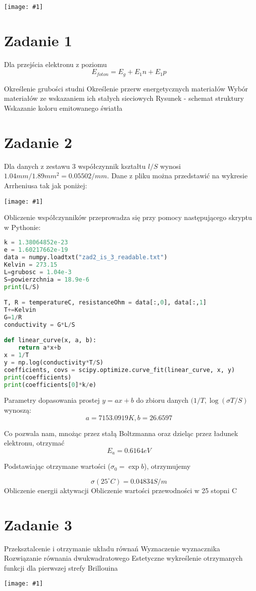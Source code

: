\documentclass[11pt]{article}
\newcommand{\largepng}[1]{\begin{center}\texttt{[image: \#1]}\end{center}}
\begin{document}
\largepng{tabelka.png}
\section{Zadanie 1}

Dla przejścia elektronu z poziomu
\[E_{foton} = E_g + E_1n + E_1p\]

Określenie grubości studni
Określenie przerw energetycznych materiałów
Wybór materiałów ze wskazaniem ich stałych sieciowych
Rysunek - schemat struktury
Wskazanie koloru emitowanego światła
\section{Zadanie 2}

Dla danych z zestawu 3 współczynnik kształtu $l/S$ wynosi $1.04mm/1.89mm^2 = 0.05502/mm$.
Dane z pliku można przedstawić na wykresie Arrheniusa tak jak poniżej:
\largepng{z2.png}

Obliczenie współczynników przeprowadza się przy pomocy następującego skryptu w Pythonie:
\begin{lstlisting}[language=Python]
k = 1.38064852e-23
e = 1.60217662e-19
data = numpy.loadtxt("zad2_is_3_readable.txt")
Kelvin = 273.15
L=grubosc = 1.04e-3
S=powierzchnia = 18.9e-6
print(L/S)

T, R = temperatureC, resistanceOhm = data[:,0], data[:,1]
T+=Kelvin
G=1/R
conductivity = G*L/S

def linear_curve(x, a, b):
    return a*x+b
x = 1/T
y = np.log(conductivity*T/S)
coefficients, covs = scipy.optimize.curve_fit(linear_curve, x, y)
print(coefficients)
print(coefficients[0]*k/e)
\end{lstlisting}

Parametry dopasowania prostej $y=ax+b$ do zbioru danych $(1/T, \log{(\sigma T/S)}$ wynoszą:
\[a = 7153.0919 K, b = 26.6597\]

Co pozwala nam, mnożąc przez stałą Boltzmanna oraz dzieląc przez ładunek elektronu, otrzymać
\[ E_a = 0.6164 eV \]

Podstawiając otrzymane wartości ($\sigma_0 = \exp{b}$), otrzymujemy

\[ \sigma(25^{\circ}C) = 0.04834 S/m \]
Obliczenie energii aktywacji
Obliczenie wartości przewodności w 25 stopni C
\section{Zadanie 3}
Przeksztalcenie i otrzymanie układu równań
Wyznaczenie wyznacznika
Rozwiązanie równania dwukwadratowego
Estetyczne wykreślenie otrzymanych funkcji dla pierwszej strefy Brillouina
\largepng{z3.png}
\end{document}
